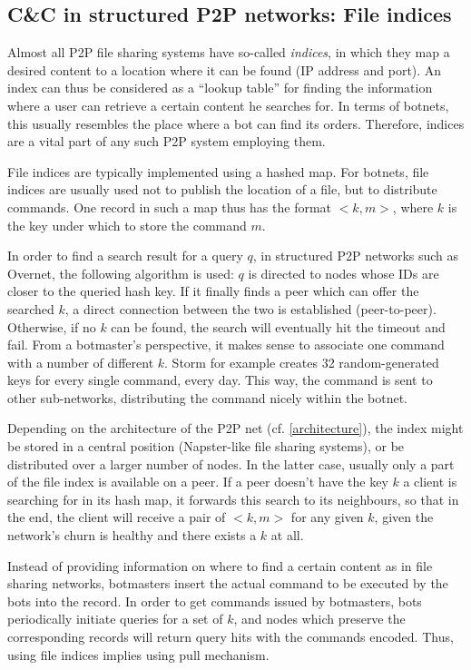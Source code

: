 \documentclass{llncs}
\begin{document}
\subsection{C\&C in structured P2P networks: File indices}
\label{distribution}
Almost all P2P file sharing systems have so-called {\it indices}, in
which they map a desired content to a location where it can be found
(IP address and port). An index can thus be considered as a ``lookup
table'' for finding the information where a user can retrieve a
certain content he searches for. In terms of botnets, this usually
resembles the place where a bot can find its orders. Therefore,
indices are a vital part of any such P2P system employing them.

File indices are typically implemented using a hashed map. For
botnets, file indices are usually used not to publish the location of
a file, but to distribute commands. One record in such a map thus has
the format $<k, m>$, where $k$ is the key under which to store the
command $m$.

In order to find a search result for a query $q$, in structured P2P
networks such as Overnet, the following algorithm is used: $q$ is
directed to nodes whose IDs are closer to the queried hash key. If it
finally finds a peer which can offer the searched $k$, a direct
connection between the two is established (peer-to-peer). Otherwise,
if no $k$ can be found, the search will eventually hit the timeout and
fail. From a botmaster's perspective, it makes sense to associate one
command with a number of different $k$. Storm for example creates 32
random-generated keys for every single command, every
day.\cite{wang2009systematic} This way, the command is sent to other
sub-networks, distributing the command nicely within the botnet.

Depending on the architecture of the P2P net (cf. \ref{architecture}),
the index might be stored in a central position (Napster-like
file sharing systems), or be distributed over a larger number of nodes.
In the latter case, usually only a part of the file index is available
on a peer. If a peer doesn't have the key $k$ a client is searching
for in its hash map, it forwards this search to its neighbours, so
that in the end, the client will receive a pair of $<k, m>$ for any
given $k$, given the network's churn is healthy and there exists a $k$
at all.

Instead of providing information on where to find a certain content as
in file sharing networks, botmasters insert the actual command to be
executed by the bots into the record.  In order to get commands issued
by botmasters, bots periodically initiate queries for a set of $k$,
and nodes which preserve the corresponding records will return query
hits with the commands encoded. Thus, using file indices implies using
pull mechanism. \cite{liang2006index}
\end{document}
